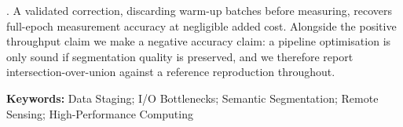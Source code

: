 . A validated correction, discarding warm-up
batches before measuring, recovers full-epoch measurement accuracy at negligible
added cost.
%
Alongside the positive throughput claim we make a negative accuracy claim: a pipeline
optimisation is only sound if segmentation quality is preserved, and we therefore
report intersection-over-union against a reference reproduction throughout.

\vspace{1em}
\textbf{Keywords:} Data Staging; I/O Bottlenecks; Semantic Segmentation; Remote Sensing;
High-Performance Computing
